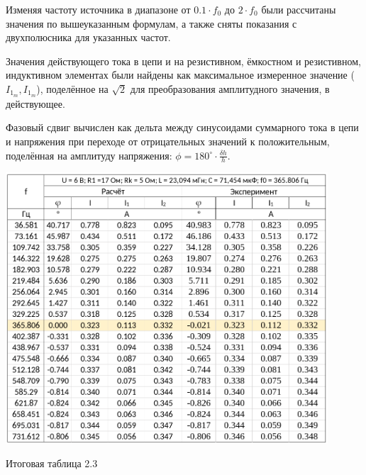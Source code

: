 Изменяя частоту источника в диапазоне от $0.1 \cdot f_0$ до $2 \cdot f_0$ были рассчитаны значения по вышеуказанным формулам, а также сняты показания с двухполюсника для указанных частот.

Значения действующего тока в цепи и на резистивном, ёмкостном и резистивном, индуктивном элементах были найдены как максимальное измеренное значение ($I_{1_m}, I_{1_m}$), поделённое на \(\sqrt{2}\) для преобразования амплитудного значения, в действующее.

Фазовый сдвиг вычислен как дельта между синусоидами суммарного тока в цепи и напряжения при переходе от отрицательных значений к положительным, поделённая на амплитуду напряжения: \( \phi = 180^{\circ} \cdot \frac{\delta h}{h}\).

\begin{table}[H]
	\captionsetup{labelformat=empty}
	\centering
	\includegraphics[width=0.9\textwidth]{./data/table_2-4.png}
	\caption{Итоговая таблица 2.3}
\end{table}
